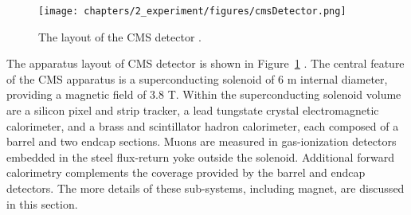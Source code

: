 \begin{figure}[ht]
    \centering
    \texttt{[image: chapters/2\_experiment/figures/cmsDetector.png]}
    \caption{The layout of the CMS detector \cite{cms:detectorOverview}.}
    \label{fig:exp:detectorOverview}
\end{figure}

The apparatus layout of CMS detector is shown in Figure~\ref{fig:exp:detectorOverview} \cite{cms:detectorOverview}. The central feature of the CMS apparatus is a superconducting solenoid of 6 m internal diameter, providing a magnetic field of 3.8 T. Within the superconducting solenoid volume are a silicon pixel and strip tracker, a lead tungstate crystal electromagnetic calorimeter, and a brass and scintillator hadron calorimeter, each composed of a barrel and two endcap sections. Muons are measured in gas-ionization detectors embedded in the steel flux-return yoke outside the solenoid. Additional forward calorimetry complements the coverage provided by the barrel and endcap detectors. The more details of these sub-systems, including magnet,  are discussed in this section. 






